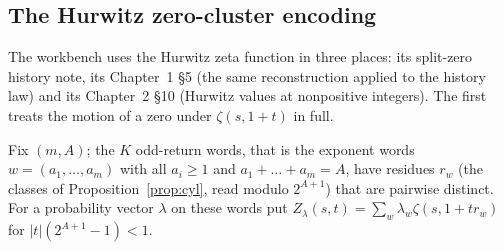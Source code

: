 \subsection{The Hurwitz zero-cluster encoding}\label{ssec:hurwitz-encoding}

The workbench uses the Hurwitz zeta function in three places: its split-zero history note, its Chapter~1 §5 (the same reconstruction applied to the history law) and its Chapter~2 §10 (Hurwitz values at nonpositive integers). The first treats the motion of a zero under $\zeta(s,1+t)$ in full.

Fix $(m,A)$; the $K$ odd-return words, that is the exponent words $w=(a_1,\dots,a_m)$ with all $a_i\ge1$ and $a_1+\dots+a_m=A$, have residues $r_w$ (the classes of Proposition~\ref{prop:cyl}, read modulo $2^{A+1}$) that are pairwise distinct. For a probability vector $\lambda$ on these words put $Z_\lambda(s,t)=\sum_w\lambda_w\zeta(s,1+tr_w)$ for $|t|(2^{A+1}-1)<1$.

